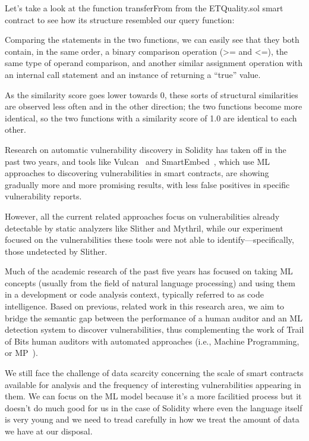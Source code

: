 Let's take a look at the function transferFrom from the ETQuality.sol smart contract to see how its structure resembled our query function:

Comparing the statements in the two functions, we can easily see that they both contain, in the same order, a binary comparison operation (>= and <=), the same type of operand comparison,
and another similar assignment operation with an internal call statement and an instance of returning a “true” value.

As the similarity score goes lower towards 0, these sorts of structural similarities are observed less often and in the other direction; the two functions become more identical, so the two
functions with a similarity score of 1.0 are identical to each other.

Research on automatic vulnerability discovery in Solidity has taken off in the past two years, and tools like Vulcan~\cite{srikant2020vulcan} and SmartEmbed~\cite{gao2019smartembed},
which use ML approaches to discovering vulnerabilities in
smart contracts, are showing gradually more and more promising results, with less false positives in specific vulnerability reports.

However, all the current related approaches focus on vulnerabilities already detectable by static analyzers like Slither and Mythril, while our experiment focused on the vulnerabilities these
tools were not able to identify—specifically, those undetected by Slither.

Much of the academic research of the past five years has focused on taking ML concepts (usually from the field of natural language processing) and using them in a development or code analysis context,
typically referred to as code intelligence.
Based on previous, related work in this research area, we aim to bridge the semantic gap between the performance of a human auditor and an ML detection system to discover vulnerabilities, thus
complementing the work of Trail of Bits human auditors with automated approaches (i.e., Machine Programming, or MP~\cite{gottschlich2018three}).

We still face the challenge of data scarcity concerning the scale of smart contracts available for analysis and the frequency of interesting vulnerabilities appearing in them.
We can focus on the ML model because it's a more facilitied process but it doesn't do much good for us in the case of Solidity where even the language itself is very young and we need to
tread carefully in how we treat the amount of data we have at our disposal.

